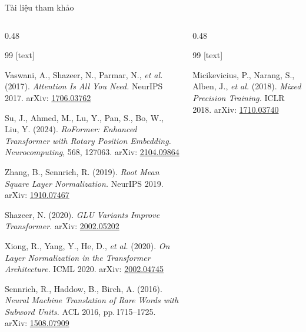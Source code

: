 \documentclass[aspectratio=169, 10pt]{beamer}
\begin{document}
\begin{frame}[shrink=25]{Tài liệu tham khảo}
  \begin{columns}[T]
    \begin{column}{0.48\textwidth}
      \begin{thebibliography}{99}
        [text]
        \scriptsize

    Vaswani, A., Shazeer, N., Parmar, N., \textit{et al.} (2017).
    \textit{Attention Is All You Need.}
    NeurIPS 2017.
    arXiv: \href{https://arxiv.org/abs/1706.03762}{1706.03762}

    Su, J., Ahmed, M., Lu, Y., Pan, S., Bo, W., Liu, Y. (2024).
    \textit{RoFormer: Enhanced Transformer with Rotary Position Embedding.}
    \textit{Neurocomputing}, 568, 127063.
    arXiv: \href{https://arxiv.org/abs/2104.09864}{2104.09864}

    Zhang, B., Sennrich, R. (2019).
    \textit{Root Mean Square Layer Normalization.}
    NeurIPS 2019.
    arXiv: \href{https://arxiv.org/abs/1910.07467}{1910.07467}

    Shazeer, N. (2020).
    \textit{GLU Variants Improve Transformer.}
    arXiv: \href{https://arxiv.org/abs/2002.05202}{2002.05202}

    Xiong, R., Yang, Y., He, D., \textit{et al.} (2020).
    \textit{On Layer Normalization in the Transformer Architecture.}
    ICML 2020.
    arXiv: \href{https://arxiv.org/abs/2002.04745}{2002.04745}

    Sennrich, R., Haddow, B., Birch, A. (2016).
    \textit{Neural Machine Translation of Rare Words with Subword Units.}
    ACL 2016, pp.\,1715--1725.
    arXiv: \href{https://arxiv.org/abs/1508.07909}{1508.07909}

      \end{thebibliography}
    \end{column}
    \begin{column}{0.48\textwidth}
      \begin{thebibliography}{99}
        [text]
        \scriptsize

    Micikevicius, P., Narang, S., Alben, J., \textit{et al.} (2018).
    \textit{Mixed Precision Training.}
    ICLR 2018.
    arXiv: \href{https://arxiv.org/abs/1710.03740}{1710.03740}


\end{thebibliography}
\end{column}
\end{columns}
\end{frame}
\end{document}

